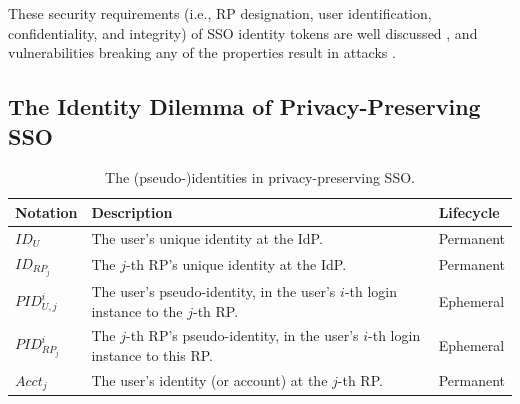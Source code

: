 These security requirements (i.e., RP designation, user identification, confidentiality, and integrity) of SSO identity tokens
     are well discussed \cite{ArmandoCCCT08,FettKS16, FettKS17},
     and
     vulnerabilities breaking any of the properties
            result in attacks \cite{SomorovskyMSKJ12, WangCW12, ArmandoCCCPS13, ZhouE14, WangZLLYLG15, WangZLG16, YangLLZH16, MainkaMS16, MainkaMSW17, YangLCZ18, YangLS17, ShiWL19, ChenPCTKT14, ccsSunB12, DiscoveringJCS, dimvaLiM16, CaoSBKVC14, TowardsShehabM14}.




\subsection{The Identity Dilemma of Privacy-Preserving SSO}
\label{subsec:challenges}
\begin{table}[t]
\footnotesize
    \caption{The (pseudo-)identities in privacy-preserving SSO.}
    \centering
    \begin{tabular}{|p{1.0cm}|p{5.1cm}|p{1.13cm}|} \hline
    {\textbf{Notation}} & {\textbf{Description}} & {\textbf{Lifecycle}} \\ \hline
    {$ID_U$} & {The user's unique identity at the IdP.} & {Permanent} \\ \hline
    {$ID_{RP_j}$} & {The $j$-th RP's unique identity at the IdP.} & {Permanent} \\ \hline
    {$PID_{U,j}^i$} & {The user's pseudo-identity, in the user's $i$-th login instance to the $j$-th RP.} & {Ephemeral} \\ \hline
    {$PID_{RP_j}^i$} & {The $j$-th RP's pseudo-identity, in the user's $i$-th login instance to this RP.} & {Ephemeral} \\ \hline
    {$Acct_j$} & {The user's identity (or account) at the $j$-th RP.} & {Permanent} \\ \hline
    \end{tabular}
    \label{tbl:notations-dilemma}
\end{table}


